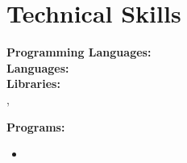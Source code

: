 \documentclass[ocgcolorlinks]{pgresume}
\author{\VAR{metadata.author}}
\begin{document}

\section{Technical Skills}
\vspace{-\baselineskip}
\begin{multicols}{2}
\textbf{Programming Languages:}\\
\vfill
\textbf{Languages:}\\
\textbf{Libraries:}\\
\texttt{}%
, %
\columnbreak

\textbf{Programs:}
\vspace{-\baselineskip}
\begin{multicols}{2}
    \begin{itemize}
        \item {}
    \end{itemize}
\end{multicols}
\end{multicols}

\end{document}
